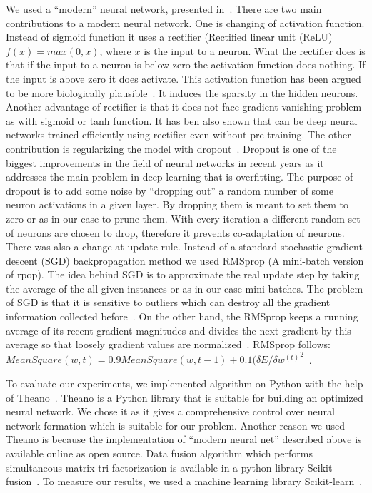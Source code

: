 \documentclass{article} %
\begin{document}
We used a “modern” neural network, presented in~\cite{github}. There are two
main contributions to a modern neural network. One is changing of activation
function. Instead of sigmoid function it uses a rectifier (Rectified linear
unit (ReLU) $f(x) = max(0, x)$, where $x$ is the input to a neuron. What the
rectifier does is that if the input to a neuron is below zero the activation
function does nothing. If the input is above zero it does activate. This
activation function has been argued to be more biologically
plausible~\cite{AISTATS2011_GlorotBB11}. It induces the sparsity in the hidden
neurons. Another advantage of rectifier is that it does not face gradient
vanishing problem as with sigmoid or tanh function. It has ben also shown that
can be deep neural networks trained efficiently using rectifier even without
pre-training. The other contribution is regularizing the model with
dropout~\cite{srivastava2014dropout}. Dropout is one of the biggest
improvements in the field of neural networks in recent years as it addresses
the main problem in deep learning that is overfitting. The purpose of dropout
is to add some noise by “dropping out” a random number of some neuron
activations in a given layer. By dropping them is meant to set them to zero or
as in our case to prune them. With every iteration a different random set of
neurons are chosen to drop, therefore it prevents co-adaptation of neurons.
There was also a change at update rule. Instead of a standard stochastic
gradient descent (SGD) backpropagation method we used RMSprop (A mini-batch
version of rpop). The idea behind SGD is to approximate the real update step by
taking the average of the all given instances or as in our case mini batches.
The problem of SGD is that it is sensitive to outliers which can destroy all
the gradient information collected before~\cite{erogol}. On the other hand, the
RMSprop keeps a running average of its recent gradient magnitudes and divides
the next gradient by this average so that loosely gradient values are
normalized~\cite{lecture}. RMSprop follows: $MeanSquare(w, t) = 0.9
MeanSquare(w, t-1) + 0.1 {({\delta E}/{\delta w^{(t)}}}^2$~\cite{lecture}.


To evaluate our experiments, we implemented algorithm on Python with the help
of Theano~\cite{Bastien-Theano-2012, bergstra+al:2010-scipy}. Theano is a
Python library that is suitable for building an optimized neural network. We
chose it as it gives a comprehensive control over neural network formation
which is suitable for our problem. Another reason we used Theano is because the
implementation of “modern neural net” described above is available online as
open source. Data fusion algorithm which performs simultaneous matrix
tri-factorization is available in a python library
Scikit-fusion~\cite{zitnik2015data}. To measure our results, we used a machine
learning library Scikit-learn~\cite{scikit-learn}.
\end{document}
